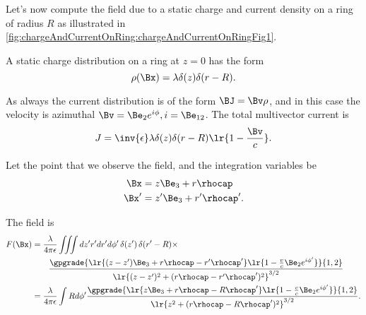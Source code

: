 %
%
Let's now compute the field due to a static charge and current density on a ring of radius \( R \) as illustrated in
\cref{fig:chargeAndCurrentOnRing:chargeAndCurrentOnRingFig1}.

A static charge distribution on a ring at \( z = 0 \) has the form
\begin{equation}\label{eqn:ringField:20}
\rho(\Bx) = \lambda \delta(z) \delta(r - R).
\end{equation}

As always the current distribution is of the form \( \BJ = \Bv \rho \), and in this case the velocity is azimuthal \( \Bv = \Be_2 e^{i\phi}, i = \Be_{12} \).
The total multivector current is
\begin{equation}\label{eqn:ringField:40}
J = \inv{\epsilon} \lambda \delta(z) \delta(r - R) \lr{ 1 - \frac{\Bv}{c} }.
\end{equation}

Let the point that we observe the field, and the integration variables be
\begin{equation}\label{eqn:ringField:60}
\begin{aligned}
\Bx &= z \Be_3 + r \rhocap \\
\Bx' &= z' \Be_3 + r' \rhocap'.
\end{aligned}
\end{equation}

The field is
\begin{equation}\label{eqn:ringField:80}
\begin{aligned}
F(\Bx)
&= \frac{\lambda}{4 \pi \epsilon} \iiint dz' r' dr' d\phi'\, \delta(z') \, \delta(r' - R) \times \\
&\qquad \frac{\gpgrade{ \lr{ (z - z') \Be_3 + r \rhocap - r' \rhocap' } \lr{ 1 - \frac{v}{c} \Be_2 e^{i\phi'} } }{1,2} } { \lr{ (z-z')^2 + (r \rhocap - r' \rhocap')^2}^{3/2} } \\
&= \frac{\lambda}{4 \pi \epsilon} \int R d\phi' \frac{\gpgrade{ \lr{ z \Be_3 + r \rhocap - R \rhocap' } \lr{ 1 - \frac{v}{c} \Be_2 e^{i\phi'} } }{1,2} } { \lr{ z^2 + (r \rhocap - R \rhocap')^2}^{3/2} }.
\end{aligned}
\end{equation}


